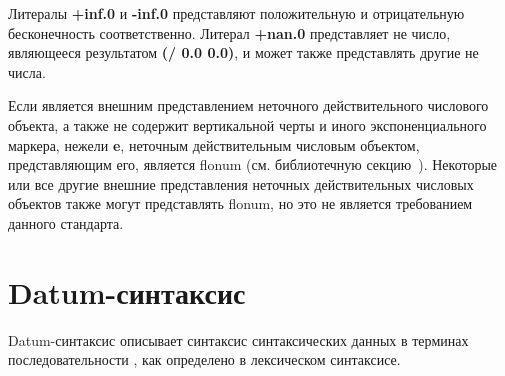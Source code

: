 Литералы {\cf\bfseries +inf.0} и {\cf\bfseries -inf.0} представляют положительную и
отрицательную бесконечность соответственно. Литерал {\cf\bfseries +nan.0} представляет не число,
являющееся результатом {\cf\bfseries(/ 0.0 0.0)}, и может также представлять другие не числа.

Если  является внешним представлением неточного действительного числового объекта, а
также не содержит вертикальной черты и иного экспоненциального маркера, нежели {\cf\bfseries e},
неточным действительным числовым объектом, представляющим его, является flonum (см. библиотечную
секцию~). Некоторые или все другие внешние представления
неточных действительных числовых объектов также могут представлять flonum, но это не является
требованием данного стандарта.

\section{Datum-синтаксис}
\label{datumsyntaxsection}

Datum-синтаксис описывает синтаксис синтаксических данных
в терминах последовательности , как определено в лексическом
синтаксисе.


